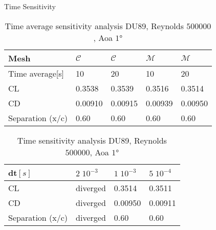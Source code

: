 \begin{frame}{Time Sensitivity}
     \begin{table}[!ht]
          \centering
          
              \begin{tabular}{l|llll}
                  \hline
                  Mesh & $\mathcal{C}$ & $\mathcal{C}$  & $\mathcal{M}$ & $\mathcal{M}$ \\  
                  \hline
                  Time average[s] & 10  & 20 & 10 & 20 \\  
                  CL&0.3538 & 0.3539 & 0.3516 & 0.3514	 \\
                  CD& 0.00910 &0.00915 & 0.00939& 0.00950  \\ 
                  Separation (x/c) & 0.60 & 0.60 & 0.60 & 0.60 \\ 
              \end{tabular}
              
          \caption{Time average sensitivity analysis DU89, Reynolds $\num{500000}$, Aoa $\ang{1}$}
          \label{tab:time-sensitivity-re500000}
     \end{table}

     \begin{table}[!ht]
          \centering
              \begin{tabular}{l|lll}
                  \hline
                  dt$[s]$ & $2\;10^{-3}$  & $1\;10^{-3}$ & $5\;10^{-4}$ \\  \hline
                  CL & diverged & 0.3514  & 0.3511 \\
                  CD & diverged & 0.00950 & 0.00911  \\ 
                  Separation (x/c) & diverged & 0.60 & 0.60 \\ 
              \end{tabular}
              
          \caption{Time sensitivity analysis DU89, Reynolds $\num{500000}$, Aoa $\ang{1}$}
          \label{tab:time-sensitivity-re500000}
          \end{table}
\end{frame}